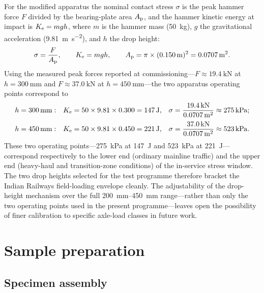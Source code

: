 For the modified apparatus the nominal contact stress $\sigma$ is the peak hammer force $F$ divided by the bearing-plate area $A_{\mathrm{p}}$, and the hammer kinetic energy at impact is $K_{\mathrm{e}} = mgh$, where $m$ is the hammer mass (\qty{50}{\kg}), $g$ the gravitational acceleration (\qty{9.81}{\m\per\s\squared}), and $h$ the drop height:
\begin{equation}
  \sigma = \frac{F}{\Ap}, \qquad \Ke = mgh, \qquad
  \Ap = \pi \times (\qty{0.150}{\m})^2 = \qty{0.0707}{\m\squared}.
  \label{eq:apparatus-stress}
\end{equation}
Using the measured peak forces reported at commissioning---$F \approx \qty{19.4}{\kN}$ at $h = \qty{300}{\mm}$ and $F \approx \qty{37.0}{\kN}$ at $h = \qty{450}{\mm}$---the two apparatus operating points correspond to
\begin{align}
  h = \qty{300}{\mm}:\quad
    &\Ke = 50 \times 9.81 \times 0.300 = \qty{147}{\J}, &
    \sigma &= \frac{\qty{19.4}{\kN}}{\qty{0.0707}{\m\squared}} \approx \qty{275}{\kPa};
    \label{eq:op-lh}\\[2pt]
  h = \qty{450}{\mm}:\quad
    &\Ke = 50 \times 9.81 \times 0.450 = \qty{221}{\J}, &
    \sigma &= \frac{\qty{37.0}{\kN}}{\qty{0.0707}{\m\squared}} \approx \qty{523}{\kPa}.
    \label{eq:op-hh}
\end{align}
These two operating points---\qty{275}{\kPa} at \qty{147}{\J} and \qty{523}{\kPa} at \qty{221}{\J}---correspond respectively to the lower end (ordinary mainline traffic) and the upper end (heavy-haul and transition-zone conditions) of the in-service stress window. The two drop heights selected for the test programme therefore bracket the Indian Railways field-loading envelope cleanly. The adjustability of the drop-height mechanism over the full \qtyrange{200}{450}{\mm} range---rather than only the two operating points used in the present programme---leaves open the possibility of finer calibration to specific axle-load classes in future work.

\section{Sample preparation}
\label{sec:sample-prep}

\subsection{Specimen assembly}
\label{sec:specimen-assembly}

